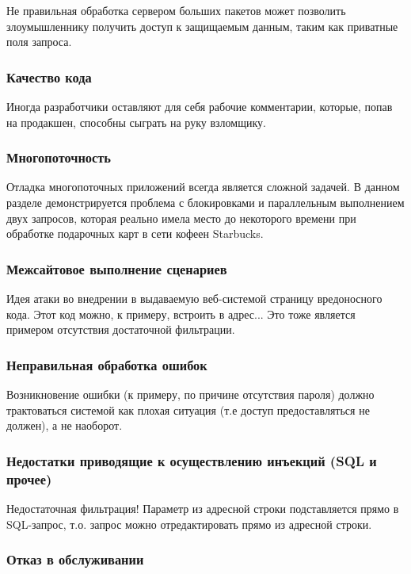 Не правильная обработка сервером больших пакетов может позволить злоумышленнику получить доступ к защищаемым данным, таким как приватные поля запроса.

\subsubsection{Качество кода}

Иногда разработчики оставляют для себя рабочие комментарии, которые, попав на продакшен, способны сыграть на руку взломщику.

\subsubsection{Многопоточность}

Отладка многопоточных приложений всегда является сложной задачей. В данном разделе демонстрируется проблема с блокировками и параллельным выполнением двух запросов, которая реально имела место до некоторого времени при обработке подарочных карт в сети кофеен Starbucks.

\subsubsection{Межсайтовое выполнение сценариев}

Идея атаки  во внедрении в выдаваемую веб-системой страницу вредоносного кода. Этот код можно, к примеру, встроить в адрес... Это тоже является примером отсутствия достаточной фильтрации.

\subsubsection{Неправильная обработка ошибок}

Возникновение ошибки (к примеру, по причине отсутствия пароля) должно трактоваться системой как плохая ситуация (т.е доступ предоставляться не должен), а не наоборот.

\subsubsection{Недостатки приводящие к осуществлению инъекций (SQL и прочее)}

Недостаточная фильтрация! Параметр из адресной строки подставляется прямо в SQL-запрос, т.о. запрос можно отредактировать прямо из адресной строки.

\subsubsection{Отказ в обслуживании}

